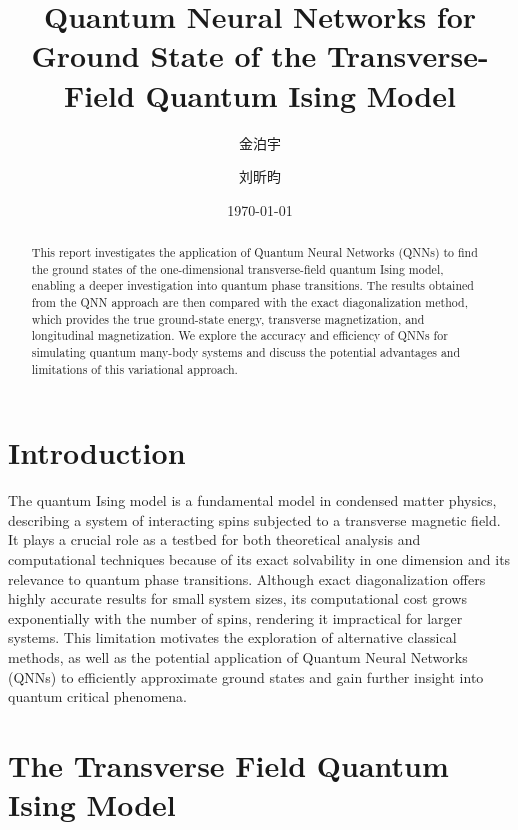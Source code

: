 \documentclass[pre,twocolumn,floatfix]{revtex4-1}
\begin{document}
\title{Quantum Neural Networks for Ground State of the Transverse-Field Quantum Ising Model}

\author{金泊宇}

\author{刘昕昀}


\date{\today}

\begin{abstract}
This report investigates the application of Quantum Neural Networks (QNNs) to find the ground states of the one-dimensional transverse-field quantum Ising model, enabling a deeper investigation into quantum phase transitions. The results obtained from the QNN approach are then compared with the exact diagonalization method, which provides the true ground-state energy, transverse magnetization, and longitudinal magnetization. We explore the accuracy and efficiency of QNNs for simulating quantum many-body systems and discuss the potential advantages and limitations of this variational approach.
\end{abstract}

\maketitle


\section{Introduction} \label{1}%
The quantum Ising model is a fundamental model in condensed matter physics, describing a system of interacting spins subjected to a transverse magnetic field. It plays a crucial role as a testbed for both theoretical analysis and computational techniques because of its exact solvability in one dimension and its relevance to quantum phase transitions. Although exact diagonalization offers highly accurate results for small system sizes, its computational cost grows exponentially with the number of spins, rendering it impractical for larger systems. This limitation motivates the exploration of alternative classical methods, as well as the potential application of Quantum Neural Networks (QNNs) to efficiently approximate ground states and gain further insight into quantum critical phenomena.\cite{QML}



\section{The Transverse Field Quantum Ising Model}
\end{document}
